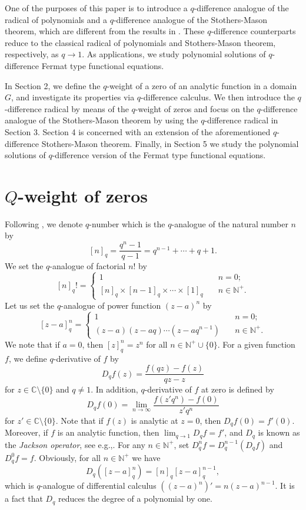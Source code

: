 \documentclass[a4paper,12pt]{article}
\newcommand{\C}{\mathbb{C}}
\newcommand{\N}{\mathbb{N}}
\numberwithin{equation}{section}
\begin{document}
One of the purposes of this paper is to introduce a $q$-difference analogue of the radical of polynomials and a $q$-difference analogue of the Stothers-Mason theorem, which are different from the results in \cite{DCL}. These $q$-difference counterparts reduce to the classical radical of polynomials and Stothers-Mason theorem, respectively, as $q\to 1$. As applications, we study polynomial solutions of $q$-difference Fermat type functional equations.

In Section 2, we define the $q$-weight of a zero of an analytic function in a domain $G$, and investigate its properties
via $q$-difference calculus. We then introduce the $q$-difference radical by means of the $q$-weight of zeros and focus on the $q$-difference analogue of the Stothers-Mason theorem by using the
$q$-difference radical in Section 3. Section 4 is concerned with an extension of the aforementioned $q$-difference Stothers-Mason theorem. Finally, in Section 5 we study the polynomial
solutions of $q$-difference version of the Fermat type functional equations.


\section{$Q$-weight of zeros}\label{dirad}

Following \cite{KC}, we denote $q$-number which is the $q$-analogue of the natural
number $n$ by
    $$
    [n]_q=\frac{q^n-1}{q-1}=q^{n-1}+\cdots+q+1.
    $$
We set the $q$-analogue of factorial $n!$ by
    $$
    [n]_q!=
    \begin{cases}
    1 \quad &n=0;\\
    [n]_q\times[n-1]_q\times \cdots \times [1]_q \quad &n\in\N^+.
    \end{cases}
    $$
Let us set the $q$-analogue of power function $(z-a)^n$ by
    $$
    [z-a]^n_q=
    \begin{cases}
    1 \quad &n=0;\\
    (z-a)(z-aq)\cdots(z-aq^{n-1}) \quad &n\in\N^+.
    \end{cases}
    $$
We note that if $a=0$, then $[z]^n_q=z^n$ for all $n\in\N^+\cup\{0\}$. For a given function $f$, we define $q$-derivative of $f$ \cite{Jackson1909} by
    $$
    D_q f(z)=\frac{f(qz)-f(z)}{qz-z}
    $$
for $z\in\C\setminus\{0\}$ and $q\neq 1$. In addition, $q$-derivative of $f$ at zero is defined by
    $$
    D_q f(0)=\lim_{n\to\infty}\frac{f(z'q^n)-f(0)}{z'q^n}
    $$
for $z'\in\C\setminus\{0\}$. Note that if $f(z)$ is analytic at $z=0$, then $D_qf(0)=f'(0)$.
Moreover, if $f$ is an analytic function, then $\lim_{q\to 1}D_qf=f'$, and $D_q$ is known as the \emph{Jackson operator}, see e.g.,\cite[Page~41]{Jackson1910}. For any $n\in\N^+$, set $D_q^nf=D_q^{n-1}(D_qf)$ and $D_q^0f=f$.
Obviously, for all $n\in\N^+$ we have
    $$
    D_q([z-a]_q^n)=[n]_q[z-a]^{n-1}_q,
    $$
which is $q$-analogue of differential calculus $((z-a)^n)'=n(z-a)^{n-1}$.
It is a fact that $D_q$ reduces the degree of a polynomial by one.
\end{document}

